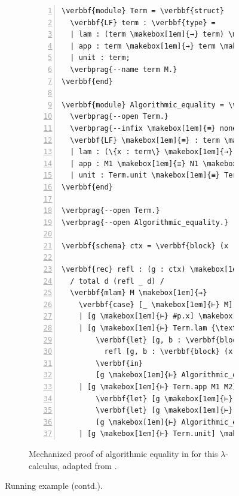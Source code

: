 \begin{figure}\ContinuedFloat
\begin{subfigure}{\linewidth}
\begin{Verbatim}[commandchars=\\\{\}, baselinestretch=1, numbers=left]
\verbbf{module} Term = \verbbf{struct}
  \verbbf{LF} term : \verbbf{type} =
  | lam : (term \makebox[1em]{→} term) \makebox[1em]{→} term
  | app : term \makebox[1em]{→} term \makebox[1em]{→} term
  | unit : term;
  \verbprag{--name term M.}
\verbbf{end}

\verbbf{module} Algorithmic_equality = \verbbf{struct}
  \verbprag{--open Term.}
  \verbprag{--infix \makebox[1em]{≡} none.}
  \verbbf{LF} \makebox[1em]{≡} : term \makebox[1em]{→} term \makebox[1em]{→} \verbbf{type} =
  | lam : (\{x : term\} \makebox[1em]{→} x \makebox[1em]{≡} x \makebox[1em]{→} M x \makebox[1em]{≡} N x) \makebox[1em]{→} Term.lam M \makebox[1em]{≡} Term.lam N
  | app : M1 \makebox[1em]{≡} N1 \makebox[1em]{→} M2 \makebox[1em]{≡} N2 \makebox[1em]{→} Term.app M1 M2 \makebox[1em]{≡} Term.app N1 N2
  | unit : Term.unit \makebox[1em]{≡} Term.unit;
\verbbf{end}

\verbprag{--open Term.}
\verbprag{--open Algorithmic_equality.}

\verbbf{schema} ctx = \verbbf{block} (x : term, eq : x \makebox[1em]{≡} x);

\verbbf{rec} refl : (g : ctx) \makebox[1em]{→} \{M : [g \makebox[1em]{⊢} term]\} \makebox[1em]{→} [g \makebox[1em]{⊢} M \makebox[1em]{≡} M] =
  / total d (refl _ d) /
  \verbbf{mlam} M \makebox[1em]{⇒}
    \verbbf{case} [_ \makebox[1em]{⊢} M] \verbbf{of}
    | [g \makebox[1em]{⊢} #p.x] \makebox[1em]{⇒} [g \makebox[1em]{⊢} #p.eq]
    | [g \makebox[1em]{⊢} Term.lam {\textbackslash}x. F] \makebox[1em]{⇒}
        \verbbf{let} [g, b : \verbbf{block} (x : term, eq : x \makebox[1em]{≡} x) \makebox[1em]{⊢} D] =
          refl [g, b : \verbbf{block} (x : term, eq : x \makebox[1em]{≡} x) \makebox[1em]{⊢} F[\monoellipsis, b.x]]
        \verbbf{in}
        [g \makebox[1em]{⊢} Algorithmic_equality.lam {\textbackslash}x. {\textbackslash}eq. D[\monoellipsis, <x; eq>]]
    | [g \makebox[1em]{⊢} Term.app M1 M2] \makebox[1em]{⇒}
        \verbbf{let} [g \makebox[1em]{⊢} D1] = refl [g \makebox[1em]{⊢} M1] \verbbf{in}
        \verbbf{let} [g \makebox[1em]{⊢} D2] = refl [g \makebox[1em]{⊢} M2] \verbbf{in}
        [g \makebox[1em]{⊢} Algorithmic_equality.app D1 D2]
    | [g \makebox[1em]{⊢} Term.unit] \makebox[1em]{⇒} [g \makebox[1em]{⊢} Algorithmic_equality.unit];
\end{Verbatim}
\caption[Algorithmic equality in \Beluga]{%
Mechanized proof of algorithmic equality in \Beluga for this $\lambda$-calculus, adapted from \cite{felty2010reasoning}.
}
\label{figure:running-example-implementation}
\end{subfigure}
\caption[]{Running example (contd.).}
\label{figure:running-example}
\end{figure}

